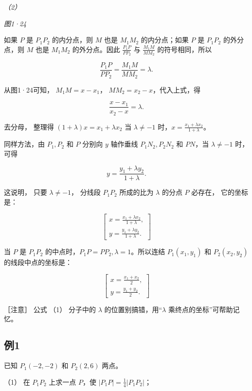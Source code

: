 \emph{（2）}

\emph{图1·24}

如果 \(P\) 是 \(P_{1}P_{2}\) 的内分点，则 \(M\) 也是 \(M_{1}M_{2}\)
的内分点；如果 \(P\) 是 \(P_{1}P_{2}\) 的外分点，则 \(M\) 也是
\(M_{1}M_{2}\) 的外分点。因此 \(\frac{P_1P}{PP_2}\) 与
\(\frac{M_1M}{MM_2}\) 的符号相同，所以

\[
\frac {P_{1} P}{PP_{2}} = \frac {M_{1} M}{MM_{2}} = \lambda.
\]

从图1·24可知， \(M_{1}M = x - x_{1}\)，
\(MM_{2} = x_{2} - x\)，代入上式，得

\[
\frac {x - x_{1}}{x_{2} - x} = \lambda.
\]

去分母， 整理得 \((1+\lambda)x=x_{1}+\lambda x_{2}\) 当
\(\lambda \neq -1\) 时，\(x = \frac{x_1 + \lambda x_2}{1 + \lambda}\)。

同样方法，由 \(P_{1}, P_{2}\) 和 \(P\) 分别向 \(y\) 轴作垂线
\(P_{1}N_{2}, P_{2}N_{2}\) 和 \(PN\)，当 \(\lambda \neq -1\) 时，可得

\[
y = \frac {y_{1} + \lambda y_{2}}{1 + \lambda}.
\]

这说明， 只要 \(\lambda \neq -1\)， 分线段 \(P_{1}P_{2}\) 所成的比为
\(\lambda\) 的分点 \(P\) 必存在， 它的坐标是：

\[
\left[ \begin{array}{l} x = \frac {x_{1} + \lambda x_{2}}{1 + \lambda}, \\ y = \frac {y_{1} + \lambda y_{2}}{1 + \lambda}. \end{array} \right] \tag {1}
\]

当 \(P\) 是 \(P_{1}P_{2}\)
的中点时，\(P_{1}P = PP_{2}, \lambda = 1\)。所以连结
\(P_{1}(x_{1}, y_{1})\) 和 \(P_{2}(x_{2}, y_{2})\) 的线段中点的坐标是：

\[
\left[ \begin{array}{c} x = \frac {x_{1} + x_{2}}{2}, \\ y = \frac {y_{1} + y_{2}}{2}. \end{array} \right] \tag {2}
\]

［注意］ 公式 （1） 分子中的 \(\lambda\) 的位置别搞错，用``\(\lambda\)
乘终点的坐标''可帮助记忆。

\subsection{例1}\label{ux4f8b1-5}

已知 \(P_{1}(-2, -2)\) 和 \(P_{2}(2, 6)\) 两点。

（1） 在 \(P_{1}P_{2}\) 上求一点 \(P\)，使
\(|P_{1}P| = \frac{1}{4} |P_{1}P_{2}|\)；

